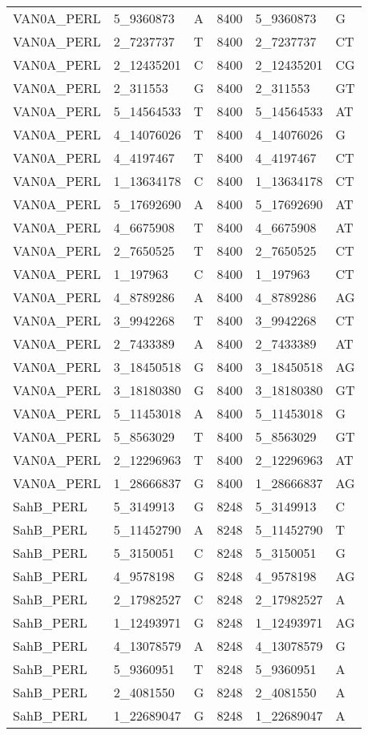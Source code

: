 \begin{center}
\begin{longtable}{|l|l|l|l|l|l|}
VAN0A\_PERL&5\_9360873&A&8400&5\_9360873&G\\
VAN0A\_PERL&2\_7237737&T&8400&2\_7237737&CT\\
VAN0A\_PERL&2\_12435201&C&8400&2\_12435201&CG\\
VAN0A\_PERL&2\_311553&G&8400&2\_311553&GT\\
VAN0A\_PERL&5\_14564533&T&8400&5\_14564533&AT\\
VAN0A\_PERL&4\_14076026&T&8400&4\_14076026&G\\
VAN0A\_PERL&4\_4197467&T&8400&4\_4197467&CT\\
VAN0A\_PERL&1\_13634178&C&8400&1\_13634178&CT\\
VAN0A\_PERL&5\_17692690&A&8400&5\_17692690&AT\\
VAN0A\_PERL&4\_6675908&T&8400&4\_6675908&AT\\
VAN0A\_PERL&2\_7650525&T&8400&2\_7650525&CT\\
VAN0A\_PERL&1\_197963&C&8400&1\_197963&CT\\
VAN0A\_PERL&4\_8789286&A&8400&4\_8789286&AG\\
VAN0A\_PERL&3\_9942268&T&8400&3\_9942268&CT\\
VAN0A\_PERL&2\_7433389&A&8400&2\_7433389&AT\\
VAN0A\_PERL&3\_18450518&G&8400&3\_18450518&AG\\
VAN0A\_PERL&3\_18180380&G&8400&3\_18180380&GT\\
VAN0A\_PERL&5\_11453018&A&8400&5\_11453018&G\\
VAN0A\_PERL&5\_8563029&T&8400&5\_8563029&GT\\
VAN0A\_PERL&2\_12296963&T&8400&2\_12296963&AT\\
VAN0A\_PERL&1\_28666837&G&8400&1\_28666837&AG\\
SahB\_PERL&5\_3149913&G&8248&5\_3149913&C\\
SahB\_PERL&5\_11452790&A&8248&5\_11452790&T\\
SahB\_PERL&5\_3150051&C&8248&5\_3150051&G\\
SahB\_PERL&4\_9578198&G&8248&4\_9578198&AG\\
SahB\_PERL&2\_17982527&C&8248&2\_17982527&A\\
SahB\_PERL&1\_12493971&G&8248&1\_12493971&AG\\
SahB\_PERL&4\_13078579&A&8248&4\_13078579&G\\
SahB\_PERL&5\_9360951&T&8248&5\_9360951&A\\
SahB\_PERL&2\_4081550&G&8248&2\_4081550&A\\
SahB\_PERL&1\_22689047&G&8248&1\_22689047&A\\

\end{longtable}
\end{center}
